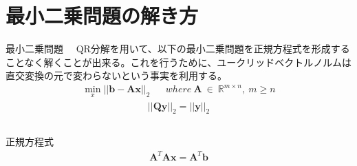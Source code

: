\documentclass[dvipdfmx,10pt,presentation]{beamer}
\begin{document}
\section{最小二乗問題の解き方}
\label{sec:org47d60f5}
\begin{frame}[allowframebreaks]{最小二乗問題}
　QR分解を用いて、以下の最小二乗問題を正規方程式を形成することなく解くことが出来る。これを行うために、ユークリッドベクトルノルムは直交変換の元で変わらないという事実を利用する。\\
\begin{align}
\min_{x}||\bm{b}-\bm{A}\bm{x}||_2&&where\ \bm{A}\ \in\ \mathbb{R}^{m\times n},\ m\geq n
\tag{5.3}
\end{align}
\begin{align*}
||\bm{Q}\bm{y}||_2=||\bm{y}||_2  
\end{align*}

\begin{columns}
\begin{column}{1.00\columnwidth}
\begin{block}{正規方程式}
\begin{align*}
\bm{A}^T\bm{A}\bm{x} = \bm{A}^T\bm{b}
\end{align*}
\end{block}
\end{column}
\end{columns}
\end{frame}
\end{document}

